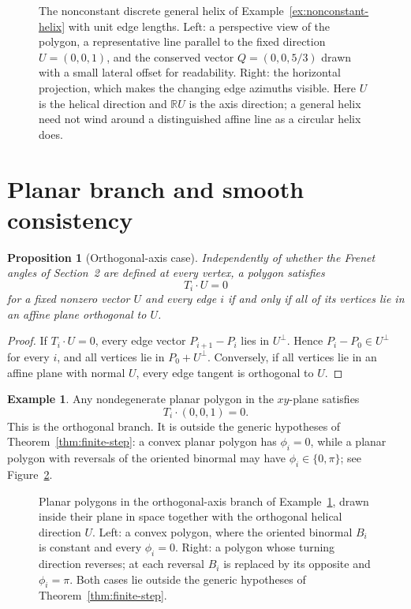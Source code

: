 \documentclass[10pt,a4paper]{amsart}
\newtheorem{proposition}[theorem]{Proposition}
\theoremstyle{definition}
\newtheorem{example}[theorem]{Example}
\theoremstyle{remark}
\numberwithin{equation}{section}
\begin{document}
\begin{figure}[!ht]
\centering
\resizebox{0.97\textwidth}{!}{}
\caption{The nonconstant discrete general helix of Example~\ref{ex:nonconstant-helix} with unit edge lengths. Left: a perspective view of the polygon, a representative line parallel to the fixed direction $U=(0,0,1)$, and the conserved vector $Q=(0,0,5/3)$ drawn with a small lateral offset for readability. Right: the horizontal projection, which makes the changing edge azimuths visible. Here $U$ is the helical direction and $\mathbb R U$ is the axis direction; a general helix need not wind around a distinguished affine line as a circular helix does.}
\label{fig:nonconstant-helix}
\end{figure}



\section{Planar branch and smooth consistency}

\begin{proposition}[Orthogonal-axis case]\label{prop:orthogonal-axis}
Independently of whether the Frenet angles of Section~2 are defined at every vertex, a polygon satisfies
\[
T_i\cdot U=0
\]
for a fixed nonzero vector \(U\) and every edge \(i\) if and only if all
of its vertices lie in an affine plane orthogonal to \(U\).
\end{proposition}

\begin{proof}
If \(T_i\cdot U=0\), every edge vector \(P_{i+1}-P_i\) lies in \(U^\perp\).
Hence \(P_i-P_0\in U^\perp\) for every \(i\), and all vertices lie in
\(P_0+U^\perp\). Conversely, if all vertices lie in an affine plane with
normal \(U\), every edge tangent is orthogonal to \(U\).
\end{proof}

\begin{example}\label{ex:planar}
Any nondegenerate planar polygon in the \(xy\)-plane satisfies
\[
T_i\cdot(0,0,1)=0.
\]
This is the orthogonal branch. It is outside the generic hypotheses of Theorem~\ref{thm:finite-step}: a convex planar polygon has $\phi_i=0$, while a planar polygon with reversals of the oriented binormal may have $\phi_i\in\{0,\pi\}$; see Figure~\ref{fig:planar-case}.
\end{example}

\begin{figure}[!ht]
\centering
\resizebox{0.97\textwidth}{!}{}
\caption{Planar polygons in the orthogonal-axis branch of Example~\ref{ex:planar}, drawn inside their plane in space together with the orthogonal helical direction $U$. Left: a convex polygon, where the oriented binormal $B_i$ is constant and every $\phi_i=0$. Right: a polygon whose turning direction reverses; at each reversal $B_i$ is replaced by its opposite and $\phi_i=\pi$. Both cases lie outside the generic hypotheses of Theorem~\ref{thm:finite-step}.}
\label{fig:planar-case}
\end{figure}
\end{document}
